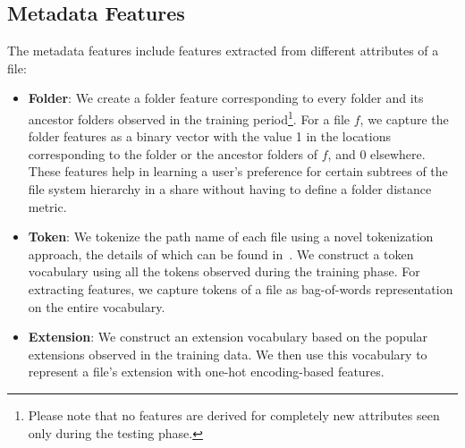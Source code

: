 \subsection{Metadata Features}
\label{sec:features}
The metadata features include features extracted from different
attributes of a file:
\begin{itemize}
  \renewcommand{\labelitemi}{$\bullet$}
\item \textbf{Folder}:
We create a folder feature corresponding to every folder and its
ancestor folders observed in the training period\footnote{Please note
  that no features are derived for completely new attributes seen only
  during the testing phase.}.  For a file $f$, we capture the folder
features as a binary vector with the value 1 in the locations
corresponding to the folder or the ancestor folders of $f$, and 0
elsewhere.  These features help in learning a user's preference for
certain subtrees of the file system hierarchy in a share without
having to define a folder distance metric.
\item \textbf{Token}:
We tokenize the path name of each file using a novel tokenization
approach, the details of which can be found in~\cite{dwiticeis15}.  We
construct a token vocabulary using all the tokens observed during the
training phase.  For extracting features, we capture tokens of a file
as bag-of-words representation on the entire vocabulary.
\item \textbf{Extension}:
We construct an extension vocabulary based on the popular extensions
observed in the training data.  We then use this vocabulary to
represent a file's extension with one-hot encoding-based features.
\end{itemize}

